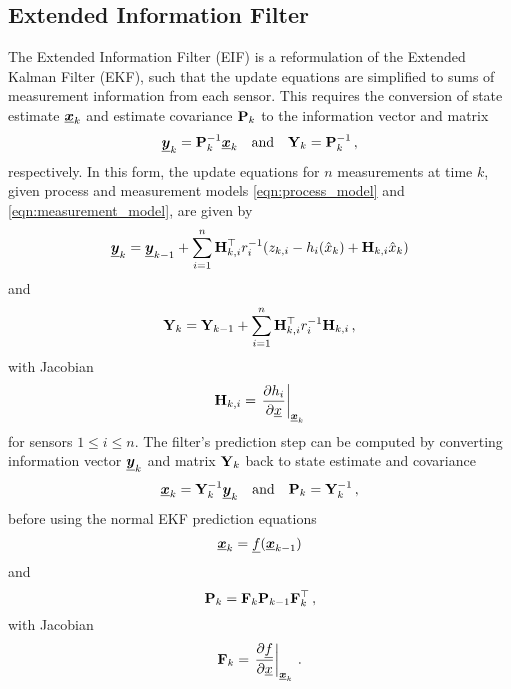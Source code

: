 \documentclass[twocolumn]{autart}
\begin{document}
\subsection{Extended Information Filter}
The Extended Information Filter (EIF) \cite{maybeckStochasticModelsEstimation1982} is a reformulation of the Extended Kalman Filter (EKF), such that the update equations are simplified to sums of measurement information from each sensor. This requires the conversion of state estimate ${\boldsymbol{\underline{x}}}_k$ and estimate covariance ${{\mathbf{P}}}_k$ to the information vector and matrix
\begin{equation}
    {\boldsymbol{\underline{y}}}_k = {{\mathbf{P}}}_k^{-1}{\boldsymbol{\underline{x}}}_k \quad\textrm{and}\quad {\ensuremath{{\mathbf{Y}}}}_k = {{\mathbf{P}}}_k^{-1}\,,
\end{equation}
respectively. In this form, the update equations for $n$ measurements at time $k$, given process and measurement models \eqref{eqn:process_model} and \eqref{eqn:measurement_model}, are given by
\begin{equation}
    {\boldsymbol{\underline{y}}}_k = {\boldsymbol{\underline{y}}}_{k-1} + \sum^n_{i=1}{{\mathbf{H}}}^\top_{k,i} r^{-1}_i (z_{k,i} - h_i(\hat{x}_k) + {{\mathbf{H}}}_{k,i}\hat{x}_k) \label{eqn:eif_info_vec_update}
\end{equation}
and
\begin{equation}
    {\ensuremath{{\mathbf{Y}}}}_k = {{\mathbf{Y}}}_{k-1} + \sum^n_{i=1}{{\mathbf{H}}}^\top_{k,i} r^{-1}_i {{\mathbf{H}}}_{k,i}\,, \label{eqn:eif_info_mat_update}
\end{equation}
with Jacobian
\begin{equation}
    {\ensuremath{{\mathbf{H}}}}_{k,i} = \left.\frac{\partial h_i}{\partial {\underline{x}}}\right|_{{\boldsymbol{\underline{x}}}_k} \label{eqn:measurement_jacobian}
\end{equation}
for sensors $1 \leq i \leq n$. The filter's prediction step can be computed by converting information vector ${\boldsymbol{\underline{y}}}_k$ and matrix ${{\mathbf{Y}}}_k$ back to state estimate and covariance 
\begin{equation}
    {\boldsymbol{\underline{x}}}_k = {{\mathbf{Y}}}_k^{-1}{\boldsymbol{\underline{y}}}_k \quad\textrm{and}\quad {\ensuremath{{\mathbf{P}}}}_k = {{\mathbf{Y}}}_k^{-1}\,,
\end{equation}
before using the normal EKF prediction equations
\begin{equation}
    {\boldsymbol{\underline{x}}}_k = {\underline{f}}({\boldsymbol{\underline{x}}}_{k-1})
\end{equation}
and
\begin{equation}
    {\ensuremath{{\mathbf{P}}}}_k = {{\mathbf{F}}}_k{{\mathbf{P}}}_{k-1}{{\mathbf{F}}}_k^\top\,,
\end{equation}
with Jacobian
\begin{equation}
    {\ensuremath{{\mathbf{F}}}}_{k} = \left.\frac{\partial {\underline{f}}}{\partial {\underline{x}}}\right|_{{\boldsymbol{\underline{x}}}_k}\,.
\end{equation}
\end{document}
